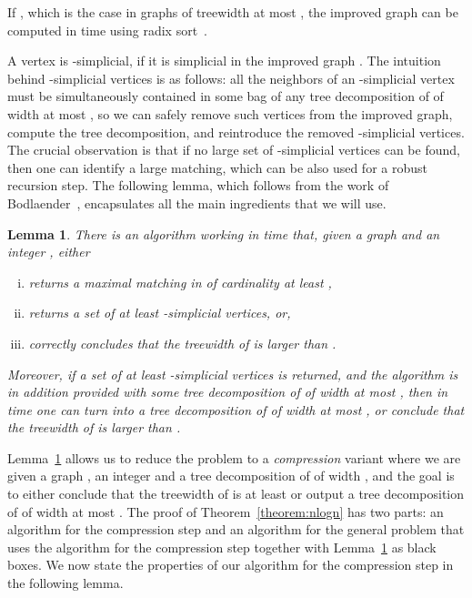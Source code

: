 \documentclass[a4paper,11pt]{article}
\newtheorem{lemma}{Lemma}[section]
\theoremstyle{definition}
\theoremstyle{remark}
\begin{document}
If , which is the case in graphs of treewidth at most ,
the improved graph can be computed in  time using
radix sort~\cite{Bodlaender96}.

A vertex  is -simplicial, if it is simplicial in the improved
graph .  The intuition behind -simplicial vertices is as
follows: all the neighbors of an -simplicial vertex must be
simultaneously contained in some bag of any tree decomposition of
 of width at most , so we can safely remove such vertices from
the improved graph, compute the tree decomposition, and reintroduce
the removed -simplicial vertices.  The crucial observation is that
if no large set of -simplicial vertices can be found, then one can
identify a large matching, which can be also used for a robust
recursion step.  The following lemma, which follows from the work of
Bodlaender~\cite{Bodlaender96}, encapsulates all the main ingredients
that we will use.

\begin{lemma}\label{lem:prelim:bodlaender}
  There is an algorithm working in  time that, given a
  graph  and an integer , either
  \begin{enumerate}[(i)]
  \item returns a maximal matching in  of cardinality at least
    ,
  \item returns a set of at least  -simplicial
    vertices, or,
  \item correctly concludes that the treewidth of  is larger than
    .
  \end{enumerate}
  Moreover, if a set  of at least 
  -simplicial vertices is returned, and the algorithm is in
  addition provided with some tree decomposition  of
   of width at most , then in 
  time one can turn  into a tree decomposition  of  of
  width at most , or conclude that the treewidth of  is larger
  than .
\end{lemma}

Lemma~\ref{lem:prelim:bodlaender} allows us to reduce the problem to a
\emph{compression} variant where we are given a graph , an integer
 and a tree decomposition of  of width , and the goal is
to either conclude that the treewidth of  is at least  or output
a tree decomposition of  of width at most .  The proof of
Theorem~\ref{theorem:nlogn} has two parts: an algorithm for the
compression step and an algorithm for the general problem that uses
the algorithm for the compression step together with
Lemma~\ref{lem:prelim:bodlaender} as black boxes.  We now state the
properties of our algorithm for the compression step in the following
lemma.
\end{document}
